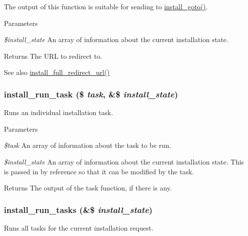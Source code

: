 The output of this function is suitable for sending to \hyperlink{install_8inc_a8500b736c9651e3947265d35fc6ab920}{install\_\-goto()}.


\begin{DoxyParams}{Parameters}
\item[{\em \$install\_\-state}]An array of information about the current installation state.\end{DoxyParams}
\begin{DoxyReturn}{Returns}
The URL to redirect to.
\end{DoxyReturn}
\begin{DoxySeeAlso}{See also}
\hyperlink{install_8core_8inc_a562ee3011859e71bb87c068340ce6dc6}{install\_\-full\_\-redirect\_\-url()} 
\end{DoxySeeAlso}
\hypertarget{install_8core_8inc_aed4e27f03b3779541b3ea5b00506f410}{
\subsubsection[{install\_\-run\_\-task}]{\setlength{\rightskip}{0pt plus 5cm}install\_\-run\_\-task (\$ {\em task}, \/  \&\$ {\em install\_\-state})}}
\label{install_8core_8inc_aed4e27f03b3779541b3ea5b00506f410}
Runs an individual installation task.


\begin{DoxyParams}{Parameters}
\item[{\em \$task}]An array of information about the task to be run. \item[{\em \$install\_\-state}]An array of information about the current installation state. This is passed in by reference so that it can be modified by the task.\end{DoxyParams}
\begin{DoxyReturn}{Returns}
The output of the task function, if there is any. 
\end{DoxyReturn}
\hypertarget{install_8core_8inc_a8ea31b06c1d5a973906d0e9b5cfa946e}{
\subsubsection[{install\_\-run\_\-tasks}]{\setlength{\rightskip}{0pt plus 5cm}install\_\-run\_\-tasks (\&\$ {\em install\_\-state})}}
\label{install_8core_8inc_a8ea31b06c1d5a973906d0e9b5cfa946e}
Runs all tasks for the current installation request.

